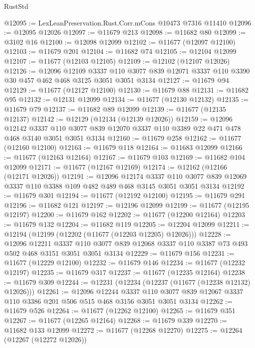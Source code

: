\begin{lexlean}{RustStd}
\begin{coremodule}
@12095 := LexLeanPreservation.Rust.Corr.mCons @10473 @7316 @11410
@12096 := @12095 @12026
@12097 := @11679 @213
@12098 := @11682 @80
@12099 := @3102 @16
@12100 := @12098 @12099
@12102 := @11677 (@12097 @12100)
@12103 := @11679 @201
@12104 := @11682 @74
@12105 := @12104 @12099
@12107 := @11677 (@12103 @12105)
@12109 := @12102 (@12107 @12026)
@12126 := @12096
    @12109
    @3337
    @110
    @3077
    @839
    @12071
    @3337
    @110
    @3390
    @30
    @457
    @462
    @468
    @3125
    @3051
    @3051
    @3134
@12127 := @11679 @94
@12129 := @11677 (@12127 @12100)
@12130 := @11679 @88
@12131 := @11682 @95
@12132 := @12131 @12099
@12134 := @11677 (@12130 @12132)
@12135 := @11679 @79
@12137 := @11682 @89 @12099
@12139 := @11677 (@12135 @12137)
@12142 := @12129 (@12134 (@12139 @12026))
@12159 := @12096
    @12142
    @3337
    @110
    @3077
    @839
    @12070
    @3337
    @110
    @3389
    @22
    @471
    @478
    @468
    @3140
    @3051
    @3051
    @3134
@12160 := @11679 @258
@12162 := @11677 (@12160 @12100)
@12163 := @11679 @118
@12164 := @11683 @12099
@12166 := @11677 (@12163 @12164)
@12167 := @11679 @103
@12169 := @11682 @104 @12099
@12171 := @11677 (@12167 @12169)
@12174 := @12162 (@12166 (@12171 @12026))
@12191 := @12096
    @12174
    @3337
    @110
    @3077
    @839
    @12069
    @3337
    @110
    @3388
    @109
    @482
    @489
    @468
    @3145
    @3051
    @3051
    @3134
@12192 := @11679 @301
@12194 := @11677 (@12192 @12100)
@12195 := @11679 @291
@12196 := @11682 @121
@12197 := @12196 @12099
@12199 := @11677 (@12195 @12197)
@12200 := @11679 @162
@12202 := @11677 (@12200 @12164)
@12203 := @11679 @132
@12204 := @11682 @119
@12205 := @12204 @12099
@12211 := @12194 (@12199 (@12202 (@11677 (@12203 @12205) @12026)))
@12228 := @12096
    @12211
    @3337
    @110
    @3077
    @839
    @12068
    @3337
    @110
    @3387
    @73
    @493
    @502
    @468
    @3151
    @3051
    @3051
    @3134
@12229 := @11679 @156
@12231 := @11677 (@12229 @12100)
@12232 := @11679 @146
@12234 := @11677 (@12232 @12197)
@12235 := @11679 @317
@12237 := @11677 (@12235 @12164)
@12238 := @11679 @309
@12244 := @12231 (@12234 (@12237 (@11677 (@12238 @12132) @12026)))
@12261 := @12096
    @12244
    @3337
    @110
    @3077
    @839
    @12067
    @3337
    @110
    @3386
    @201
    @506
    @515
    @468
    @3156
    @3051
    @3051
    @3134
@12262 := @11679 @526
@12264 := @11677 (@12262 @12100)
@12265 := @11679 @351
@12267 := @11677 (@12265 @12164)
@12268 := @11679 @339
@12270 := @11682 @133 @12099
@12272 := @11677 (@12268 @12270)
@12275 := @12264 (@12267 (@12272 @12026))

\end{coremodule}
\end{lexlean}
